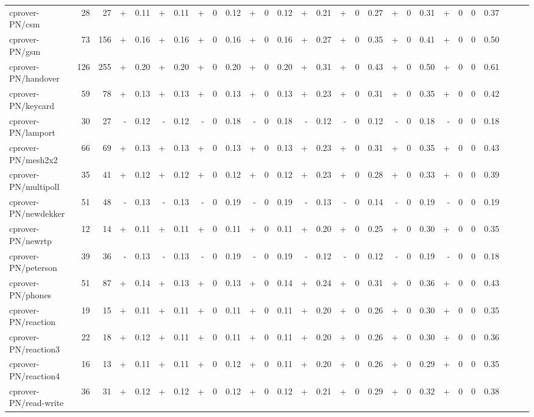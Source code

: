 \documentclass{article}
\begin{document}
\begin{table}[h]
\begin{center}
\begin{tabular}{ | l | r | r | *{25}{ r | } }
cprover-PN/csm & 28 & 27 & + & 0.11 & + & 0.11 & + & 0 & 0.12 & + & 0 & 0.12 & + & 0.21 & + & 0 & 0.27 & + & 0 & 0.31 & + & 0 & 0 & 0.37 \\
cprover-PN/gsm & 73 & 156 & + & 0.16 & + & 0.16 & + & 0 & 0.16 & + & 0 & 0.16 & + & 0.27 & + & 0 & 0.35 & + & 0 & 0.41 & + & 0 & 0 & 0.50 \\
cprover-PN/handover & 126 & 255 & + & 0.20 & + & 0.20 & + & 0 & 0.20 & + & 0 & 0.20 & + & 0.31 & + & 0 & 0.43 & + & 0 & 0.50 & + & 0 & 0 & 0.61 \\
cprover-PN/keycard & 59 & 78 & + & 0.13 & + & 0.13 & + & 0 & 0.13 & + & 0 & 0.13 & + & 0.23 & + & 0 & 0.31 & + & 0 & 0.35 & + & 0 & 0 & 0.42 \\
cprover-PN/lamport & 30 & 27 & - & 0.12 & - & 0.12 & - & 0 & 0.18 & - & 0 & 0.18 & - & 0.12 & - & 0 & 0.12 & - & 0 & 0.18 & - & 0 & 0 & 0.18 \\
cprover-PN/mesh2x2 & 66 & 69 & + & 0.13 & + & 0.13 & + & 0 & 0.13 & + & 0 & 0.13 & + & 0.23 & + & 0 & 0.31 & + & 0 & 0.35 & + & 0 & 0 & 0.43 \\
cprover-PN/multipoll & 35 & 41 & + & 0.12 & + & 0.12 & + & 0 & 0.12 & + & 0 & 0.12 & + & 0.23 & + & 0 & 0.28 & + & 0 & 0.33 & + & 0 & 0 & 0.39 \\
cprover-PN/newdekker & 51 & 48 & - & 0.13 & - & 0.13 & - & 0 & 0.19 & - & 0 & 0.19 & - & 0.13 & - & 0 & 0.14 & - & 0 & 0.19 & - & 0 & 0 & 0.19 \\
cprover-PN/newrtp & 12 & 14 & + & 0.11 & + & 0.11 & + & 0 & 0.11 & + & 0 & 0.11 & + & 0.20 & + & 0 & 0.25 & + & 0 & 0.30 & + & 0 & 0 & 0.35 \\
cprover-PN/peterson & 39 & 36 & - & 0.13 & - & 0.13 & - & 0 & 0.19 & - & 0 & 0.19 & - & 0.12 & - & 0 & 0.12 & - & 0 & 0.19 & - & 0 & 0 & 0.18 \\
cprover-PN/phones & 51 & 87 & + & 0.14 & + & 0.13 & + & 0 & 0.13 & + & 0 & 0.14 & + & 0.24 & + & 0 & 0.31 & + & 0 & 0.36 & + & 0 & 0 & 0.43 \\
cprover-PN/reaction & 19 & 15 & + & 0.11 & + & 0.11 & + & 0 & 0.11 & + & 0 & 0.11 & + & 0.20 & + & 0 & 0.26 & + & 0 & 0.30 & + & 0 & 0 & 0.35 \\
cprover-PN/reaction3 & 22 & 18 & + & 0.12 & + & 0.11 & + & 0 & 0.11 & + & 0 & 0.11 & + & 0.20 & + & 0 & 0.26 & + & 0 & 0.30 & + & 0 & 0 & 0.36 \\
cprover-PN/reaction4 & 16 & 13 & + & 0.11 & + & 0.11 & + & 0 & 0.12 & + & 0 & 0.11 & + & 0.20 & + & 0 & 0.26 & + & 0 & 0.29 & + & 0 & 0 & 0.35 \\
cprover-PN/read-write & 36 & 31 & + & 0.12 & + & 0.12 & + & 0 & 0.12 & + & 0 & 0.12 & + & 0.21 & + & 0 & 0.29 & + & 0 & 0.32 & + & 0 & 0 & 0.38 \\

\end{tabular}
\end{center}
\end{table}
\end{document}

